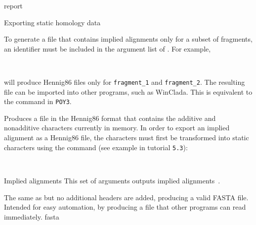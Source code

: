 \begin{command}{report}{}
\begin{arguments}
\begin{argumentgroup}{Exporting static homology data}
                \begin{statement}
	      To generate a file that contains implied
                alignments only for a subset of fragments, an identifier must be
                included in the argument list of . For
                example, 
                \begin{flushleft}
                 \\
                \end{flushleft}
                will produce Hennig86 files only for
                \texttt{fragment\_1} and \texttt {fragment\_2}. The resulting file can 
                be imported into other programs,
                such as WinClada.  This is equivalent to the
                 command in \texttt{POY3}.
	\end{statement}


                {Produces a file in the Hennig86 format that contains the
                additive and nonadditive characters currently in memory.  In
                order to export an implied alignment as a Hennig86 file, the
                characters must first be transformed into static characters
                using the  command (see example in tutorial \texttt{5.3}): 
                \begin{flushleft}
                     \\
                \end{flushleft}}
                {}
		
		\end{argumentgroup}
		
	\begin{argumentgroup}{Implied alignments}
            {This set of arguments outputs implied alignments~\cite{wheeler2003}.} 

            {The same as  but no additional headers
                are added, producing a valid FASTA file. Intended for easy
                automation, by producing a file that other programs can read
                immediately.}
                {fasta}


\end{argumentgroup}
\end{arguments}
\end{command}
